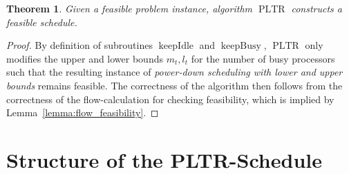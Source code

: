 \documentclass[a4paper]{article}
\DeclareMathOperator{\PLTR}{PLTR}
\DeclareMathOperator{\keepidle}{keepIdle}
\DeclareMathOperator{\keepbusy}{keepBusy}
\newtheorem{theorem}{Theorem}
\begin{document}
\begin{theorem}
  Given a feasible problem instance, algorithm $\PLTR$ constructs a feasible schedule.
\end{theorem}
\begin{proof}
  By definition of subroutines $\keepidle$ and $\keepbusy$, $\PLTR$ only modifies the upper and lower bounds $m_t, l_t$ for the number of busy processors such that the resulting instance of \emph{power-down scheduling with lower and upper bounds} remains feasible.
  The correctness of the algorithm then follows from the correctness of the flow-calculation for checking feasibility, which is implied by Lemma~\ref{lemma:flow_feasibility}.
\end{proof}

\section{Structure of the PLTR-Schedule}
\end{document}

